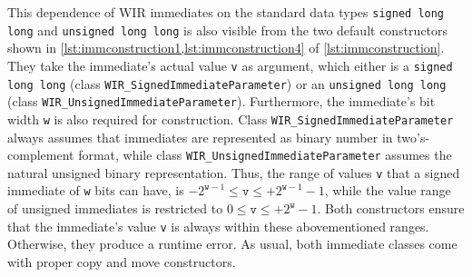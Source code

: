 This dependence of \gls{WIR} immediates on the standard data types \texttt{signed long long} and \texttt{unsigned long long} is also visible from the two default constructors shown in \cref{lst:immconstruction1,lst:immconstruction4} of \cref{lst:immconstruction}.
They take the immediate's actual value \texttt{v} as argument, which either is a \texttt{signed long long} (class \texttt{WIR\_Signed\-ImmediateParameter}) or an \texttt{unsigned long long} (class \texttt{WIR\_UnsignedImmediateParameter}).
Furthermore, the immediate's bit width \texttt{w} is also required for construction.
Class \texttt{WIR\_SignedImmediateParameter} always assumes that immediates are represented as binary number in two's-complement format, while class \texttt{WIR\_UnsignedImmediateParameter} assumes the natural unsigned binary representation.
Thus, the range of values \texttt{v} that a signed immediate of \texttt{w} bits can have, is $-2^{\texttt{w}-1} \leq \texttt{v} \leq +2^{\texttt{w}-1}-1$, while the value range of unsigned immediates is restricted to $0 \leq \texttt{v} \leq +2^\texttt{w}-1$.
Both constructors ensure that the immediate's value \texttt{v} is always within these abovementioned ranges.
Otherwise, they produce a runtime error.
As usual, both immediate classes come with proper copy and move constructors.

